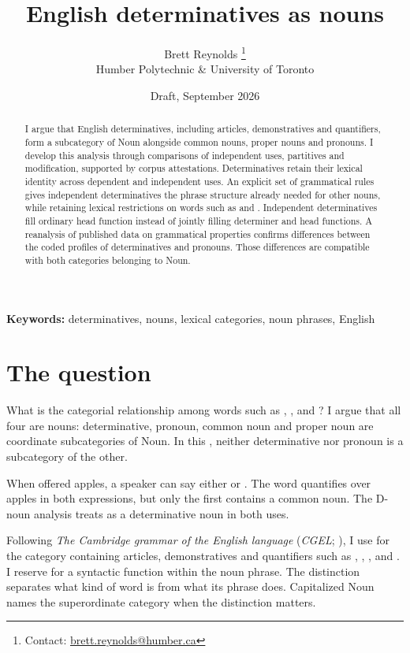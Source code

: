 \documentclass[12pt]{article}
\title{English determinatives as nouns}
\author{Brett Reynolds \orcidlink{0000-0003-0073-7195}%
\thanks{Contact: \href{mailto:brett.reynolds@humber.ca}{brett.reynolds@humber.ca}}\\
Humber Polytechnic \& University of Toronto}
\date{Draft, September 2026}
\begin{document}
\maketitle

\begin{abstract}
I argue that English determinatives, including articles, demonstratives and quantifiers, form a subcategory of Noun alongside common nouns, proper nouns and pronouns. I develop this analysis through comparisons of independent uses, partitives and modification, supported by corpus attestations. Determinatives retain their lexical identity across dependent and independent uses. An explicit set of grammatical rules gives independent determinatives the phrase structure already needed for other nouns, while retaining lexical restrictions on words such as  and . Independent determinatives fill ordinary head function instead of jointly filling determiner and head functions. A reanalysis of published data on grammatical properties confirms differences between the coded profiles of determinatives and pronouns. Those differences are compatible with both categories belonging to Noun.
\end{abstract}

\noindent\textbf{Keywords:} determinatives, nouns, lexical categories, noun phrases, English

\section{The question}\label{sec:intro}

What is the categorial relationship among words such as , ,  and ? I argue that all four are nouns: determinative, pronoun, common noun and proper noun are coordinate subcategories of Noun. In this , neither determinative nor pronoun is a subcategory of the other.

When offered apples, a speaker can say either  or . The word  quantifies over apples in both expressions, but only the first contains a common noun. The D-noun analysis treats  as a determinative noun in both uses.

Following \textit{The Cambridge grammar of the English language} (\textit{CGEL}; \citealt{huddleston2002}), I use  for the category containing articles, demonstratives and quantifiers such as , , ,  and . I reserve  for a syntactic function within the noun phrase. The distinction separates what kind of word  is from what its phrase does. Capitalized Noun names the superordinate category when the distinction matters.
\end{document}
